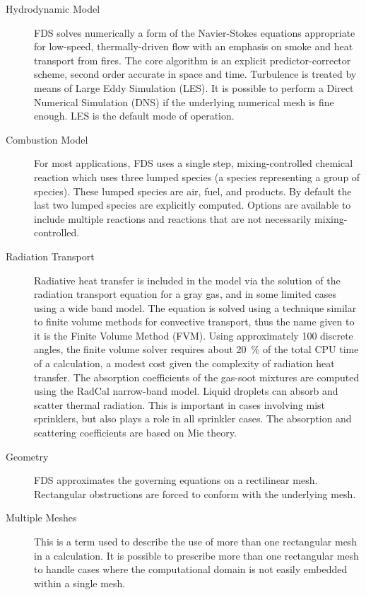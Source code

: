 \documentclass[11pt]{book}
\begin{document}
\begin{description}
\item[Hydrodynamic Model]
FDS solves numerically a form of the Navier-Stokes equations appropriate
for low-speed, thermally-driven flow with an emphasis on
smoke and heat transport from fires. The core algorithm is an
explicit predictor-corrector scheme, second order accurate in space
and time. Turbulence is treated by means of Large Eddy Simulation (LES). It is possible to perform a Direct
Numerical Simulation (DNS) if the underlying numerical mesh is fine
enough. LES is the default mode of operation.

\item[Combustion Model]
For most applications, FDS uses a single step, mixing-controlled chemical reaction which uses three lumped species (a species representing a group of species).
These lumped species are air, fuel, and products. By default the last two lumped species are explicitly
computed. Options are available to include multiple reactions and reactions that are not necessarily mixing-controlled.

\item[Radiation Transport] Radiative heat transfer is included in the
model via the solution of the radiation transport equation for a
gray gas, and in some limited cases using a wide band
model.  The equation is solved using a technique similar to finite
volume methods for convective transport, thus the name given to it is
the Finite Volume Method (FVM).  Using approximately 100 discrete
angles, the finite volume solver requires about 20~\% of the total CPU
time of a calculation, a modest cost given the complexity of radiation
heat transfer. The absorption coefficients of the gas-soot mixtures
are computed using the RadCal narrow-band model.  Liquid droplets can
absorb and scatter thermal radiation. This is important in cases
involving mist sprinklers, but also plays a role in all sprinkler
cases.  The absorption and scattering coefficients are based on Mie
theory.

\item[Geometry]
FDS approximates the governing equations on a rectilinear mesh.
Rectangular obstructions are forced to conform with the underlying mesh.

\item[Multiple Meshes] This is a term used to describe the use of
more than one rectangular mesh in a calculation. It is possible to prescribe
more than one rectangular mesh to handle cases where the computational
domain is not easily embedded within a single mesh.


\end{description}
\end{document}
